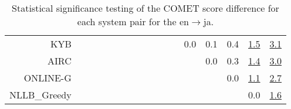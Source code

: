 \documentclass[11pt]{article}
\begin{document}
\begin{sidewaystable}
\begin{center}
{\begin{tabular}{rcccccccccccccccc}
KYB &  &  &  &  &  &  &  &  &  &  &  & \cellcolor{red!0} 0.0 & \cellcolor{red!0} 0.1 & \cellcolor{red!0} 0.4 & \cellcolor{red!70} \underline{1.5} & \cellcolor{red!70} \underline{3.1}\\ 
AIRC &  &  &  &  &  &  &  &  &  &  &  &  & \cellcolor{red!0} 0.0 & \cellcolor{red!0} 0.3 & \cellcolor{red!70} \underline{1.4} & \cellcolor{red!70} \underline{3.0}\\ 
ONLINE-G &  &  &  &  &  &  &  &  &  &  &  &  &  & \cellcolor{red!0} 0.0 & \cellcolor{red!70} \underline{1.1} & \cellcolor{red!70} \underline{2.7}\\ 
NLLB\_Greedy &  &  &  &  &  &  &  &  &  &  &  &  &  &  & \cellcolor{red!0} 0.0 & \cellcolor{red!70} \underline{1.6}\\ 
\bottomrule 
\end{tabular} }
\caption{Statistical significance testing of the COMET score difference for each system pair for the en$\rightarrow$ja.} 
 \end{center} \end{sidewaystable} 
\end{document}
